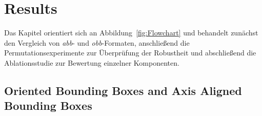 \chapter{Results}
\label{ch:results}
Das Kapitel orientiert sich an Abbildung~\ref{fig:Flowchart} und behandelt zunächst den Vergleich von \textit{abb}- und \textit{obb}-Formaten, anschließend die Permutationsexperimente zur Überprüfung der Robustheit und abschließend die Ablationsstudie zur Bewertung einzelner Komponenten. 


\section{Oriented Bounding Boxes and Axis Aligned Bounding Boxes}

